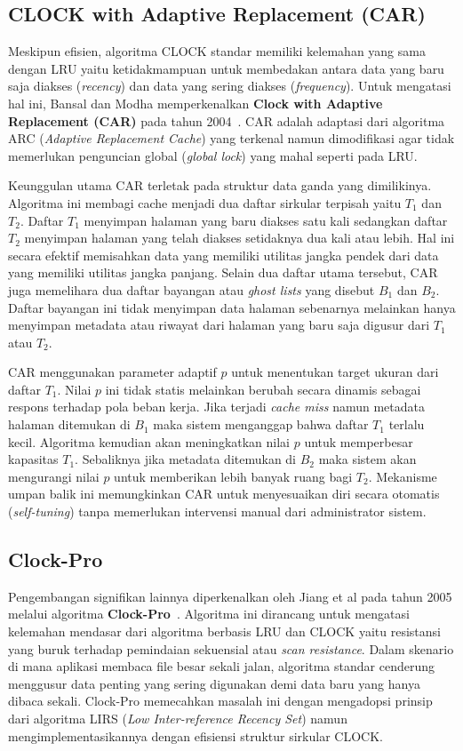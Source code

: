 \subsection{CLOCK with Adaptive Replacement (CAR)}
Meskipun efisien, algoritma CLOCK standar memiliki kelemahan yang
sama dengan LRU yaitu ketidakmampuan untuk membedakan antara data
yang baru saja diakses (\textit{recency}) dan data yang sering
diakses (\textit{frequency}).
Untuk mengatasi hal ini, Bansal dan Modha memperkenalkan
\textbf{Clock with Adaptive Replacement (CAR)} pada tahun
2004~\cite{Bansal2004CAR}.
CAR adalah adaptasi dari algoritma ARC (\textit{Adaptive Replacement
Cache}) yang terkenal namun dimodifikasi agar tidak memerlukan
penguncian global (\textit{global lock}) yang mahal seperti pada LRU.

Keunggulan utama CAR terletak pada struktur data ganda yang dimilikinya.
Algoritma ini membagi cache menjadi dua daftar sirkular terpisah
yaitu $T_1$ dan $T_2$.
Daftar $T_1$ menyimpan halaman yang baru diakses satu kali sedangkan
daftar $T_2$ menyimpan halaman yang telah diakses setidaknya dua kali
atau lebih.
Hal ini secara efektif memisahkan data yang memiliki utilitas jangka
pendek dari data yang memiliki utilitas jangka panjang.
Selain dua daftar utama tersebut, CAR juga memelihara dua daftar
bayangan atau \textit{ghost lists} yang disebut $B_1$ dan $B_2$.
Daftar bayangan ini tidak menyimpan data halaman sebenarnya melainkan
hanya menyimpan metadata atau riwayat dari halaman yang baru saja
digusur dari $T_1$ atau $T_2$.

CAR menggunakan parameter adaptif $p$ untuk menentukan target ukuran
dari daftar $T_1$.
Nilai $p$ ini tidak statis melainkan berubah secara dinamis sebagai
respons terhadap pola beban kerja.
Jika terjadi \textit{cache miss} namun metadata halaman ditemukan di
$B_1$ maka sistem menganggap bahwa daftar $T_1$ terlalu kecil.
Algoritma kemudian akan meningkatkan nilai $p$ untuk memperbesar
kapasitas $T_1$.
Sebaliknya jika metadata ditemukan di $B_2$ maka sistem akan
mengurangi nilai $p$ untuk memberikan lebih banyak ruang bagi $T_2$.
Mekanisme umpan balik ini memungkinkan CAR untuk menyesuaikan diri
secara otomatis (\textit{self-tuning}) tanpa memerlukan intervensi
manual dari administrator sistem.

\subsection{Clock-Pro}
Pengembangan signifikan lainnya diperkenalkan oleh Jiang et al pada
tahun 2005 melalui algoritma \textbf{Clock-Pro}~\cite{Jiang2005CLOCKPro}.
Algoritma ini dirancang untuk mengatasi kelemahan mendasar dari
algoritma berbasis LRU dan CLOCK yaitu resistansi yang buruk terhadap
pemindaian sekuensial atau \textit{scan resistance}.
Dalam skenario di mana aplikasi membaca file besar sekali jalan,
algoritma standar cenderung menggusur data penting yang sering
digunakan demi data baru yang hanya dibaca sekali.
Clock-Pro memecahkan masalah ini dengan mengadopsi prinsip dari
algoritma LIRS (\textit{Low Inter-reference Recency Set}) namun
mengimplementasikannya dengan efisiensi struktur sirkular CLOCK.

